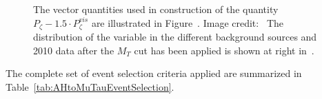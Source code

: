 \begin{figure}[t]
\begin{center}
   \caption[Reconstruction and distribution of \Pzeta
  discriminant]{The vector quantities used in construction of the quantity
  $P_{\zeta} - 1.5 \cdot P_{\zeta}^{vis}$ are illustrated in
  Figure~.  Image credit:~\cite{CDFrefPzeta} The
  distribution of the \Pzeta variable in the different background sources and
  2010 data after the $M_T$ cut has been applied is shown at right
  in~.} \label{fig:PzetaPlots}
\end{center}
\end{figure} 
The complete set of event selection criteria applied are summarized in
Table~\ref{tab:AHtoMuTauEventSelection}.

